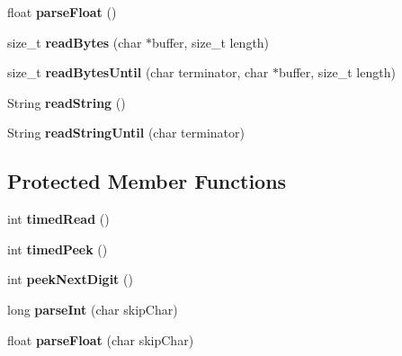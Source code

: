 \begin{DoxyCompactItemize}
\item 
\hypertarget{class_stream_a5e5a0cc11eb586d89dcb7fa8e53a87e8}{}float {\bfseries parse\+Float} ()\label{class_stream_a5e5a0cc11eb586d89dcb7fa8e53a87e8}

\item 
\hypertarget{class_stream_a45fd1336a323ea83b16e8507055f44ea}{}size\+\_\+t {\bfseries read\+Bytes} (char $\ast$buffer, size\+\_\+t length)\label{class_stream_a45fd1336a323ea83b16e8507055f44ea}

\item 
\hypertarget{class_stream_af84672a4fb2620466958d3118d4fea00}{}size\+\_\+t {\bfseries read\+Bytes\+Until} (char terminator, char $\ast$buffer, size\+\_\+t length)\label{class_stream_af84672a4fb2620466958d3118d4fea00}

\item 
\hypertarget{class_stream_a1c60bdda2b65d78e5a1362d51b856c5a}{}String {\bfseries read\+String} ()\label{class_stream_a1c60bdda2b65d78e5a1362d51b856c5a}

\item 
\hypertarget{class_stream_a6a409da87c552909260d8cc428c5ca70}{}String {\bfseries read\+String\+Until} (char terminator)\label{class_stream_a6a409da87c552909260d8cc428c5ca70}

\end{DoxyCompactItemize}
\subsection*{Protected Member Functions}
\begin{DoxyCompactItemize}
\item 
\hypertarget{class_stream_a416a0ada5ed3c9d27f1e72c7d73f0aa1}{}int {\bfseries timed\+Read} ()\label{class_stream_a416a0ada5ed3c9d27f1e72c7d73f0aa1}

\item 
\hypertarget{class_stream_ae326bf60a3c5276836526710871046fe}{}int {\bfseries timed\+Peek} ()\label{class_stream_ae326bf60a3c5276836526710871046fe}

\item 
\hypertarget{class_stream_ab31c533ddc422c8d8df07986e5920534}{}int {\bfseries peek\+Next\+Digit} ()\label{class_stream_ab31c533ddc422c8d8df07986e5920534}

\item 
\hypertarget{class_stream_a4578615defade6c4ce7daeb6578bb62d}{}long {\bfseries parse\+Int} (char skip\+Char)\label{class_stream_a4578615defade6c4ce7daeb6578bb62d}

\item 
\hypertarget{class_stream_a14a98cdbb166008f25dd044d836b1864}{}float {\bfseries parse\+Float} (char skip\+Char)\label{class_stream_a14a98cdbb166008f25dd044d836b1864}

\end{DoxyCompactItemize}
